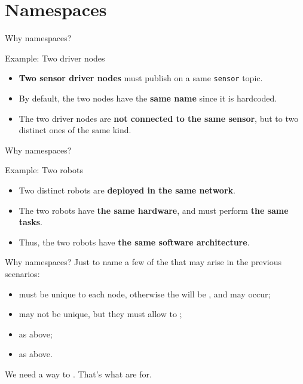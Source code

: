 
\section{Namespaces}

\begin{frame}{Why namespaces?}
  \justifying
  \begin{exampleblock}{Example: Two driver nodes}
    \justifying
    \begin{itemize}
      \item \textbf{Two sensor driver nodes} must publish on a same \texttt{sensor} topic.
      \item By default, the two nodes have the \textbf{same name} since it is hardcoded.
      \item The two driver nodes are \textbf{not connected to the same sensor}, but to two distinct ones of the same kind.
    \end{itemize}
  \end{exampleblock}
\end{frame}
\begin{frame}{Why namespaces?}
  \begin{exampleblock}{Example: Two robots}
    \justifying
    \begin{itemize}
      \item Two distinct robots are \textbf{deployed in the same network}.
      \item The two robots have \textbf{the same hardware}, and must perform \textbf{the same tasks}.
      \item Thus, the two robots have \textbf{the same software architecture}.
    \end{itemize}
  \end{exampleblock}
\end{frame}
\begin{frame}{Why namespaces?}
  \justifying
  Just to name a few of the  that may arise in the previous scenarios:
  \begin{itemize}
    \item {} must be unique to each node, otherwise the  will be , and  may occur;
    \item {} may not be unique, but they must allow to ;
    \item {} as above;
    \item {} as above.
  \end{itemize}
  \bigskip
  We need a way to . That's what  are for.
\end{frame}

